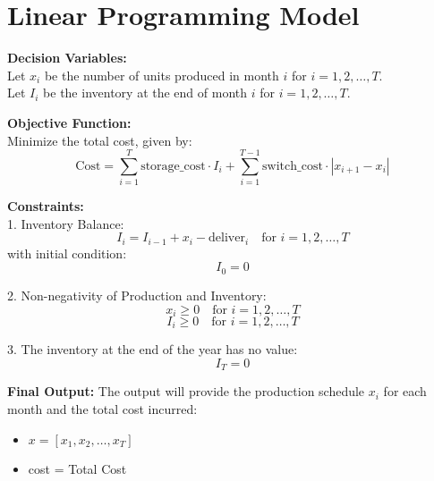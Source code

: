 \documentclass{article}
\begin{document}
\section*{Linear Programming Model}

\textbf{Decision Variables:} \\
Let \( x_i \) be the number of units produced in month \( i \) for \( i = 1, 2, \ldots, T \). \\
Let \( I_i \) be the inventory at the end of month \( i \) for \( i = 1, 2, \ldots, T \).

\textbf{Objective Function:} \\
Minimize the total cost, given by:
\[
\text{Cost} = \sum_{i=1}^{T} \text{storage\_cost} \cdot I_i + \sum_{i=1}^{T-1} \text{switch\_cost} \cdot |x_{i+1} - x_i| 
\]

\textbf{Constraints:} \\

1. Inventory Balance:
\[
I_i = I_{i-1} + x_i - \text{deliver}_i \quad \text{for } i = 1, 2, \ldots, T
\]
with initial condition:
\[
I_0 = 0
\]

2. Non-negativity of Production and Inventory:
\[
x_i \geq 0 \quad \text{for } i = 1, 2, \ldots, T
\]
\[
I_i \geq 0 \quad \text{for } i = 1, 2, \ldots, T
\]

3. The inventory at the end of the year has no value:
\[
I_T = 0
\]

\textbf{Final Output:}
The output will provide the production schedule \( x_i \) for each month and the total cost incurred:

\begin{itemize}
    \item \( x = [x_1, x_2, \ldots, x_T] \)
    \item cost = Total Cost
\end{itemize}
\end{document}

